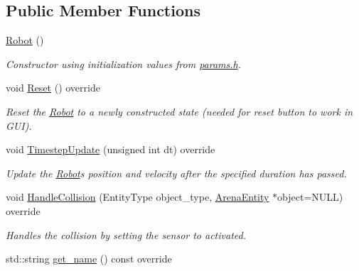 \subsection*{Public Member Functions}
\begin{DoxyCompactItemize}
\item 
\mbox{\label{class_robot_a4fc7c70ae20623f05e06f2ecb388b6c4}} 
\mbox{\hyperlink{class_robot_a4fc7c70ae20623f05e06f2ecb388b6c4}{Robot}} ()
\begin{DoxyCompactList}\small\item\em Constructor using initialization values from \mbox{\hyperlink{params_8h}{params.\+h}}. \end{DoxyCompactList}\item 
\mbox{\label{class_robot_af597fd14927d2cd5308ded62f4e54e29}} 
void \mbox{\hyperlink{class_robot_af597fd14927d2cd5308ded62f4e54e29}{Reset}} () override
\begin{DoxyCompactList}\small\item\em Reset the \mbox{\hyperlink{class_robot}{Robot}} to a newly constructed state (needed for reset button to work in G\+UI). \end{DoxyCompactList}\item 
void \mbox{\hyperlink{class_robot_ae790462f8782efcfd26082eedec30ed5}{Timestep\+Update}} (unsigned int dt) override
\begin{DoxyCompactList}\small\item\em Update the \mbox{\hyperlink{class_robot}{Robot}}\textquotesingle{}s position and velocity after the specified duration has passed. \end{DoxyCompactList}\item 
\mbox{\label{class_robot_a4fc6b01fec869b559197d8e4b9686249}} 
void \mbox{\hyperlink{class_robot_a4fc6b01fec869b559197d8e4b9686249}{Handle\+Collision}} (Entity\+Type object\+\_\+type, \mbox{\hyperlink{class_arena_entity}{Arena\+Entity}} $\ast$object=N\+U\+LL) override
\begin{DoxyCompactList}\small\item\em Handles the collision by setting the sensor to activated. \end{DoxyCompactList}\item 
\mbox{\label{class_robot_a3f77c13705b8f60480d21d8d936dc39e}} 
std\+::string \mbox{\hyperlink{class_robot_a3f77c13705b8f60480d21d8d936dc39e}{get\+\_\+name}} () const override

\end{DoxyCompactItemize}
